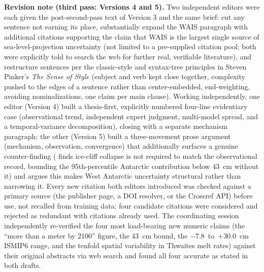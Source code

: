 \documentclass[12pt]{article}
\begin{document}
\noindent\textbf{Revision note (third pass: Versions 4 and 5).} Two
independent editors were each given the post-second-pass text of Version 3
and the same brief: cut any sentence not earning its place, substantially
expand the WAIS paragraph with additional citations supporting the claim
that WAIS is the largest single source of sea-level-projection uncertainty
(not limited to a pre-supplied citation pool; both were explicitly told to
search the web for further real, verifiable literature), and restructure
sentences per the classic-style and syntax-tree principles in Steven
Pinker's \emph{The Sense of Style} (subject and verb kept close together,
complexity pushed to the edges of a sentence rather than center-embedded,
end-weighting, avoiding nominalizations, one claim per main clause).
Working independently, one editor (Version 4) built a thesis-first,
explicitly numbered four-line evidentiary case (observational trend,
independent expert judgment, multi-model spread, and a temporal-variance
decomposition), closing with a separate mechanism paragraph; the other
(Version 5) built a three-movement prose argument (mechanism, observation,
convergence) that additionally surfaces a genuine counter-finding
(\citealt{Edwards2019} finds ice-cliff collapse is not required to match
the observational record, bounding the 95th-percentile Antarctic
contribution below 43~cm without it) and argues this makes West Antarctic
uncertainty structural rather than narrowing it. Every new citation both
editors introduced was checked against a primary source (the publisher
page, a DOI resolver, or the Crossref API) before use, not recalled from
training data; four candidate citations were considered and rejected as
redundant with citations already used. The coordinating session
independently re-verified the four most load-bearing new numeric claims
(the \citealt{DeContoP2016} ``more than a meter by 2100'' figure, the
\citealt{Edwards2019} 43~cm bound, the \citealt{Seroussi2020}
$-$7.8~to~+30.0~cm ISMIP6 range, and the \citealt{Milillo2019}
tenfold spatial variability in Thwaites melt rates) against their
original abstracts via web search and found all four accurate as stated
in both drafts.
\end{document}
